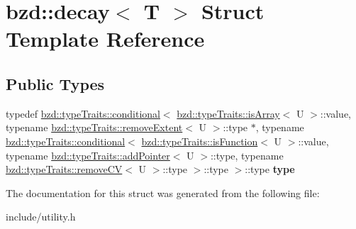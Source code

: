 \hypertarget{structbzd_1_1decay}{}\section{bzd\+:\+:decay$<$ T $>$ Struct Template Reference}
\label{structbzd_1_1decay}
\subsection*{Public Types}
\begin{DoxyCompactItemize}
\item 
\mbox{\label{structbzd_1_1decay_af64bbc678ec3955778fcb1619dc62e2b}} 
typedef \hyperlink{structbzd_1_1typeTraits_1_1conditional}{bzd\+::type\+Traits\+::conditional}$<$ \hyperlink{structbzd_1_1typeTraits_1_1isArray}{bzd\+::type\+Traits\+::is\+Array}$<$ U $>$\+::value, typename \hyperlink{structbzd_1_1typeTraits_1_1removeExtent}{bzd\+::type\+Traits\+::remove\+Extent}$<$ U $>$\+::type $\ast$, typename \hyperlink{structbzd_1_1typeTraits_1_1conditional}{bzd\+::type\+Traits\+::conditional}$<$ \hyperlink{structbzd_1_1typeTraits_1_1isFunction}{bzd\+::type\+Traits\+::is\+Function}$<$ U $>$\+::value, typename \hyperlink{structbzd_1_1typeTraits_1_1addPointer}{bzd\+::type\+Traits\+::add\+Pointer}$<$ U $>$\+::type, typename \hyperlink{structbzd_1_1typeTraits_1_1removeCV}{bzd\+::type\+Traits\+::remove\+CV}$<$ U $>$\+::type $>$\+::type $>$\+::type {\bfseries type}
\end{DoxyCompactItemize}


The documentation for this struct was generated from the following file\+:\begin{DoxyCompactItemize}
\item 
include/utility.\+h\end{DoxyCompactItemize}
